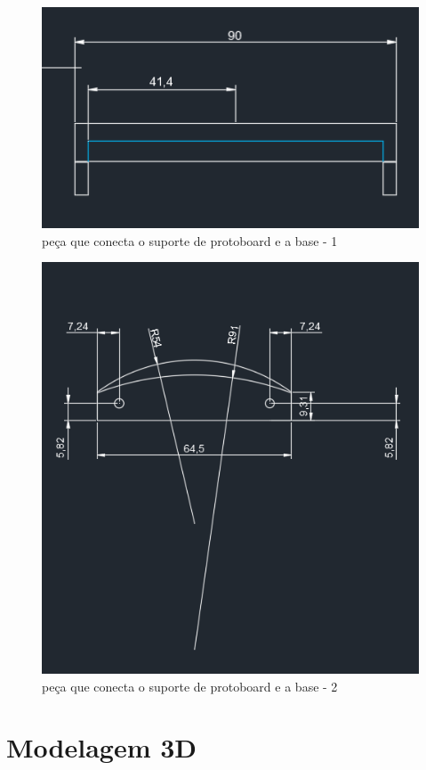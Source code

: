 \begin{figure}[h]
	\centering
	\includegraphics{figures/cad4}
	\caption{peça que conecta o suporte de protoboard e a base - 1}
	\label{fig:peca_juncao}
\end{figure}

\begin{figure}[h]
	\centering
	\includegraphics{figures/cad4_2}
	\caption{peça que conecta o suporte de protoboard e a base - 2}
	\label{fig:peca_juncao_2}
\end{figure}



\chapter{Modelagem 3D}
\label{att_fabricao_montagem_modelagem}

